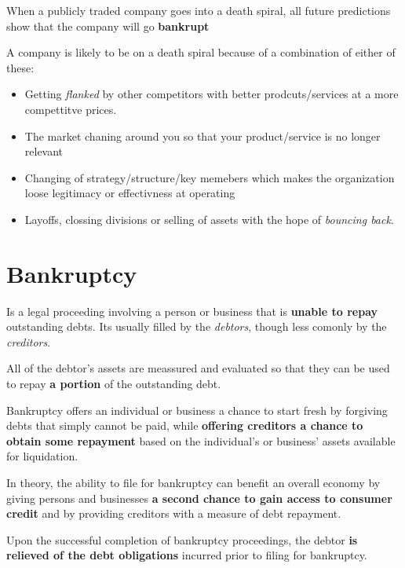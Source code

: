When a publicly traded company goes into a death spiral, all future predictions show that the company will go \textbf{bankrupt}

A company is likely to be on a death spiral because of a combination of either of these:
\begin{itemize}
	\item Getting \textit{flanked} by other competitors with better prodcuts/services at a more compettitve prices.
	\item The market chaning around you so that your product/service is no longer relevant
	\item Changing of strategy/structure/key memebers which makes the organization loose legitimacy or effectivness at operating
	\item Layoffs, clossing divisions or selling of assets with the hope of \textit{bouncing back}.
\end{itemize}


\section{Bankruptcy} 

Is a legal proceeding involving a person or business that is \textbf{unable to repay} outstanding debts. Its usually filled by the \textit{debtors}, though less comonly by the \textit{creditors}.

All of the debtor's assets are meassured and evaluated so that they can be used to repay \textbf{a portion} of the outstanding debt.

Bankruptcy offers an individual or business a chance to start fresh by forgiving debts that simply cannot be paid, while \textbf{offering creditors a chance to obtain some repayment} based on the individual's or business' assets available for liquidation.

In theory, the ability to file for bankruptcy can benefit an overall economy by giving persons and businesses \textbf{a second chance to gain access to consumer credit} and by providing creditors with a measure of debt repayment.

Upon the successful completion of bankruptcy proceedings, the debtor \textbf{is relieved of the debt obligations} incurred prior to filing for bankruptcy.

